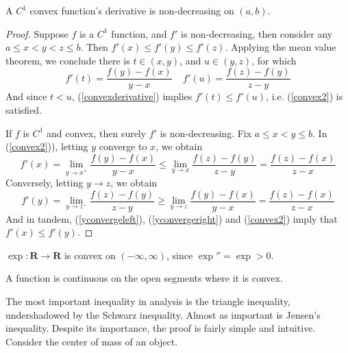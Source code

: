\begin{lemma}
    A $C^1$ convex function's derivative is non-decreasing on $(a,b)$.
\end{lemma}
\begin{proof}
    Suppose $f$ is a $C^1$ function, and $f'$ is non-decreasing, then consider any $a \leq x < y < z \leq b$. Then $f'(x) \leq f'(y) \leq f'(z)$. Applying the mean value theorem, we conclude there is $t \in (x,y)$, and $u \in (y,z)$, for which
    \begin{equation} \label{convexderivative} f'(t) = \frac{f(y) - f(x)}{y - x}\ \ \ \ \ f'(u) = \frac{f(z) - f(y)}{z - y} \end{equation}
    And since $t < u$, (\ref{convexderivative}) implies $f'(t) \leq f'(u)$, i.e. (\ref{convex2}) is satisfied.

    If $f$ is $C^1$ and convex, then surely $f'$ is non-decreasing. Fix $a \leq x < y \leq b$. In (\ref{convex2})), letting $y$ converge to $x$, we obtain
    \begin{equation} \label{yconvergeleft} f'(x) = \lim_{y \to x^+} \frac{f(y) - f(x)}{y - x} \leq \lim_{y \to x} \frac{f(z) - f(y)}{z - y} = \frac{f(z) - f(x)}{z - x} \end{equation}
    Conversely, letting $y \to z$, we obtain
    \begin{equation} \label{yconvergeright} f'(y) = \lim_{y \to z^-} \frac{f(z) - f(y)}{z - y} \geq \lim_{y \to z} \frac{f(y) - f(x)}{y - x} = \frac{f(z) - f(x)}{z - x} \end{equation}
    And in tandem, (\ref{yconvergeleft}), (\ref{yconvergeright}) and (\ref{convex2}) imply that $f'(x) \leq f'(y)$.
\end{proof}

\begin{example}
    $\exp: \mathbf{R} \to \mathbf{R}$ is convex on $(-\infty, \infty)$, since $\exp'' = \exp > 0$.
\end{example}

\begin{lemma}
    A function is continuous on the open segments where it is convex.
\end{lemma}

The most important inequality in analysis is the triangle inequality, undershadowed by the Schwarz inequality. Almost as important is Jensen's inequality. Despite its importance, the proof is fairly simple and intuitive. Consider the center of mass of an object.  

